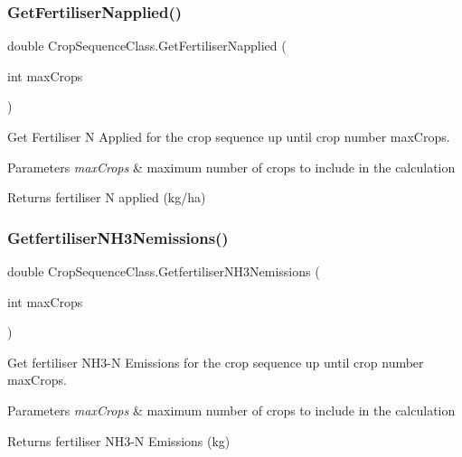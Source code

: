 \subsubsection{\texorpdfstring{GetFertiliserNapplied()}{GetFertiliserNapplied()}}
{\footnotesize\ttfamily double Crop\+Sequence\+Class.\+Get\+Fertiliser\+Napplied (\begin{DoxyParamCaption}\item[{int}]{max\+Crops }\end{DoxyParamCaption})\hspace{0.3cm}{\ttfamily [inline]}}



Get Fertiliser N Applied for the crop sequence up until crop number max\+Crops. 


\begin{DoxyParams}{Parameters}
{\em max\+Crops} & maximum number of crops to include in the calculation \\
\hline
\end{DoxyParams}
\begin{DoxyReturn}{Returns}
fertiliser N applied (kg/ha) 
\end{DoxyReturn}
\mbox{\label{class_crop_sequence_class_a61ef6bc1ddc06e99da8951319e1082d9}} 
\subsubsection{\texorpdfstring{GetfertiliserNH3Nemissions()}{GetfertiliserNH3Nemissions()}}
{\footnotesize\ttfamily double Crop\+Sequence\+Class.\+Getfertiliser\+N\+H3\+Nemissions (\begin{DoxyParamCaption}\item[{int}]{max\+Crops }\end{DoxyParamCaption})\hspace{0.3cm}{\ttfamily [inline]}}



Get fertiliser N\+H3-\/N Emissions for the crop sequence up until crop number max\+Crops. 


\begin{DoxyParams}{Parameters}
{\em max\+Crops} & maximum number of crops to include in the calculation \\
\hline
\end{DoxyParams}
\begin{DoxyReturn}{Returns}
fertiliser N\+H3-\/N Emissions (kg) 
\end{DoxyReturn}
\mbox{\label{class_crop_sequence_class_aa8f5a123e42333f86e3282c134298864}} 
